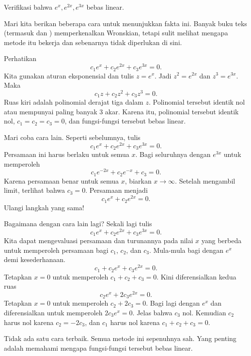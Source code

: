 \begin{example}
Verifikasi bahwa $e^x, e^{2x}, e^{3x}$ bebas linear.

Mari kita berikan beberapa cara untuk menunjukkan fakta ini. Banyak buku teks (termasuk \cite{EP} dan \cite{F}) memperkenalkan Wronskian, tetapi sulit melihat mengapa metode itu bekerja dan sebenarnya tidak diperlukan di sini.

Perhatikan
\begin{equation*}
c_1 e^x + c_2 e^{2x} + c_3 e^{3x} = 0.
\end{equation*}
Kita gunakan aturan eksponensial dan tulis $z = e^x$. Jadi $z^2 = e^{2x}$ dan $z^3 = e^{3x}$. Maka
\begin{equation*}
c_1 z + c_2 z^2 + c_3 z^3 = 0.
\end{equation*}
Ruas kiri adalah polinomial derajat tiga dalam $z$. Polinomial tersebut identik nol atau mempunyai paling banyak 3 akar. Karena itu, polinomial tersebut identik nol, $c_1 = c_2 = c_3 = 0$, dan fungsi-fungsi tersebut bebas linear.

Mari coba cara lain. Seperti sebelumnya, tulis
\begin{equation*}
c_1 e^x + c_2 e^{2x} + c_3 e^{3x} = 0.
\end{equation*}
Persamaan ini harus berlaku untuk semua $x$. Bagi seluruhnya dengan $e^{3x}$ untuk memperoleh
\begin{equation*}
c_1 e^{-2x} + c_2 e^{-x} + c_3 = 0.
\end{equation*}
Karena persamaan benar untuk semua $x$, biarkan $x \to \infty$. Setelah mengambil limit, terlihat bahwa $c_3 = 0$. Persamaan menjadi
\begin{equation*}
c_1 e^x + c_2 e^{2x} = 0.
\end{equation*}
Ulangi langkah yang sama!

Bagaimana dengan cara lain lagi? Sekali lagi tulis
\begin{equation*}
c_1 e^x + c_2 e^{2x} + c_3 e^{3x} = 0.
\end{equation*}
Kita dapat mengevaluasi persamaan dan turunannya pada nilai $x$ yang berbeda untuk memperoleh persamaan bagi $c_1$, $c_2$, dan $c_3$. Mula-mula bagi dengan $e^{x}$ demi kesederhanaan.
\begin{equation*}
c_1 + c_2 e^{x} + c_3 e^{2x} = 0.
\end{equation*}
Tetapkan $x=0$ untuk memperoleh $c_1 + c_2 + c_3 = 0$. Kini diferensialkan kedua ruas
\begin{equation*}
c_2 e^{x} + 2 c_3 e^{2x} = 0 .
\end{equation*}
Tetapkan $x=0$ untuk memperoleh $c_2 + 2c_3 = 0$. Bagi lagi dengan $e^x$ dan diferensialkan untuk memperoleh $2 c_3 e^{x} = 0$. Jelas bahwa $c_3$ nol. Kemudian $c_2$ harus nol karena $c_2 = -2c_3$, dan $c_1$ harus nol karena $c_1 + c_2 + c_3 = 0$.

Tidak ada satu cara terbaik. Semua metode ini sepenuhnya sah. Yang penting adalah memahami mengapa fungsi-fungsi tersebut bebas linear.
\end{example}


